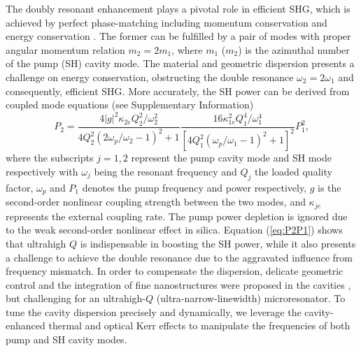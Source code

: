 \documentclass[a4paper,8pt,hyperref, twocolumn, aps, prl]{article}
\begin{document}
The doubly resonant enhancement plays a pivotal role in efficient SHG, which is achieved by perfect phase-matching including momentum conservation and energy conservation \cite{boyd2003nonlinear}.
The former can be fulfilled by a pair of modes with proper angular momentum relation $m_2=2m_1$, where $m_1$ ($m_2$) is the azimuthal number of the pump (SH) cavity mode. 
The material and geometric dispersion presents a challenge on energy conservation, obstructing the double resonance $\omega_2=2\omega_1$ and consequently, efficient SHG. 
More accurately, the SH power can be derived from coupled mode equations (see Supplementary Information)
\begin{equation}
P_2 = \frac{4|g|^2\kappa_{2e}Q_2^2/\omega_2^2}{4Q_2^2(2\omega_p/\omega_2-1)^2+1}\frac{16\kappa_{1e}^2Q_1^4/\omega_1^4}{[4Q_1^2(\omega_p/\omega_1-1)^2+1]^2}P_1^2,
\label{eq:P2P1}
\end{equation}
where the subscripts $j=1, 2$  represent the pump cavity mode and SH mode respectively with $\omega_j$ being the resonant frequency and $Q_j$ the loaded quality factor, $\omega_p$ and $P_1$ denotes the pump frequency and power respectively, $g$ is the second-order nonlinear coupling strength between the two modes, and $\kappa_{je}$ represents the external coupling rate. The pump power depletion is ignored due to the weak second-order nonlinear effect in silica.
Equation (\ref{eq:P2P1}) shows that ultrahigh $Q$ is indispensable in boosting the SH power, while it also presents a challenge to achieve the double resonance due to the aggravated influence from frequency mismatch. 
In order to compensate the dispersion, delicate geometric control and the integration of fine nanostructures were proposed in the cavities \cite{levy2011harmonic, kozyreff2008whispering, xu2008second, dominguez2011whispering}, but challenging for an ultrahigh-$Q$ (ultra-narrow-linewidth) microresonator.  
To tune the cavity dispersion precisely and dynamically, we leverage the cavity-enhanced thermal and optical Kerr effects to manipulate the frequencies of both pump and SH cavity modes. 
\end{document}
